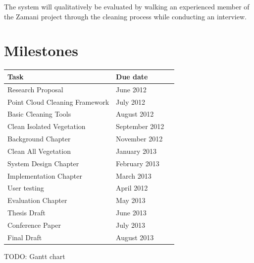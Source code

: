 \documentclass[10pt,twocolumn]{article}
\begin{document}

The system will qualitatively be evaluated by walking an experienced member of the Zamani project through the cleaning process while conducting an interview.
			

\section{Milestones}
\begin{table}[h]
\begin{tabular}{llr}
\hline
Task & Due date \\
\hline
Research Proposal & June 2012\\
Point Cloud Cleaning Framework & July 2012\\
Basic Cleaning Tools & August 2012\\
Clean Isolated Vegetation & September 2012\\
Background Chapter & November 2012\\
Clean All Vegetation & January 2013\\
System Design Chapter & February 2013\\
Implementation Chapter & March 2013\\
User testing & April 2012\\
Evaluation Chapter & May 2013\\
Thesis Draft & June 2013\\
Conference Paper & July 2013\\
Final Draft & August 2013\\
\hline
\end{tabular}
\end{table}

TODO: Gantt chart






\end{document}
